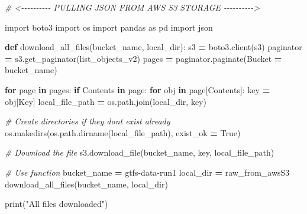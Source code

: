 \documentclass[
  12pt,
]{article}
\newenvironment{Shaded}{\begin{snugshade}}{\end{snugshade}}
\newcommand{\BuiltInTok}[1]{#1}
\newcommand{\CommentTok}[1]{\textcolor[rgb]{0.56,0.35,0.01}{\textit{#1}}}
\newcommand{\ControlFlowTok}[1]{\textcolor[rgb]{0.13,0.29,0.53}{\textbf{#1}}}
\newcommand{\ImportTok}[1]{#1}
\newcommand{\KeywordTok}[1]{\textcolor[rgb]{0.13,0.29,0.53}{\textbf{#1}}}
\newcommand{\NormalTok}[1]{#1}
\newcommand{\OperatorTok}[1]{\textcolor[rgb]{0.81,0.36,0.00}{\textbf{#1}}}
\newcommand{\StringTok}[1]{\textcolor[rgb]{0.31,0.60,0.02}{#1}}
\newcommand{\VariableTok}[1]{\textcolor[rgb]{0.00,0.00,0.00}{#1}}
\begin{document}
\begin{Shaded}
\begin{Highlighting}[]
\CommentTok{\# \textless{}{-}{-}{-}{-}{-}{-}{-}{-}{-}{-} PULLING JSON FROM AWS S3 STORAGE {-}{-}{-}{-}{-}{-}{-}{-}{-}{-}\textgreater{}}

\ImportTok{import}\NormalTok{ boto3}
\ImportTok{import}\NormalTok{ os}
\ImportTok{import}\NormalTok{ pandas }\ImportTok{as}\NormalTok{ pd}
\ImportTok{import}\NormalTok{ json}

\KeywordTok{def}\NormalTok{ download\_all\_files(bucket\_name, local\_dir):}
\NormalTok{    s3 }\OperatorTok{=}\NormalTok{ boto3.client(}\StringTok{\textquotesingle{}s3\textquotesingle{}}\NormalTok{)}
\NormalTok{    paginator }\OperatorTok{=}\NormalTok{ s3.get\_paginator(}\StringTok{\textquotesingle{}list\_objects\_v2\textquotesingle{}}\NormalTok{)}
\NormalTok{    pages }\OperatorTok{=}\NormalTok{ paginator.paginate(Bucket }\OperatorTok{=}\NormalTok{ bucket\_name)}

    \ControlFlowTok{for}\NormalTok{ page }\KeywordTok{in}\NormalTok{ pages:}
        \ControlFlowTok{if} \StringTok{\textquotesingle{}Contents\textquotesingle{}} \KeywordTok{in}\NormalTok{ page:}
            \ControlFlowTok{for}\NormalTok{ obj }\KeywordTok{in}\NormalTok{ page[}\StringTok{\textquotesingle{}Contents\textquotesingle{}}\NormalTok{]:}
\NormalTok{                key }\OperatorTok{=}\NormalTok{ obj[}\StringTok{\textquotesingle{}Key\textquotesingle{}}\NormalTok{]}
\NormalTok{                local\_file\_path }\OperatorTok{=}\NormalTok{ os.path.join(local\_dir, key)}

                \CommentTok{\# Create directories if they don\textquotesingle{}t exist already}
\NormalTok{                os.makedirs(os.path.dirname(local\_file\_path), exist\_ok }\OperatorTok{=} \VariableTok{True}\NormalTok{)}

                \CommentTok{\# Download the file}
\NormalTok{                s3.download\_file(bucket\_name, key, local\_file\_path)}

\CommentTok{\# Use function}
\NormalTok{bucket\_name }\OperatorTok{=} \StringTok{\textquotesingle{}gtfs{-}data{-}run1\textquotesingle{}}
\NormalTok{local\_dir }\OperatorTok{=} \StringTok{\textquotesingle{}raw\_from\_awsS3\textquotesingle{}}
\NormalTok{download\_all\_files(bucket\_name, local\_dir)}

\BuiltInTok{print}\NormalTok{(}\StringTok{"All files downloaded"}\NormalTok{)}


\end{Highlighting}
\end{Shaded}
\end{document}
